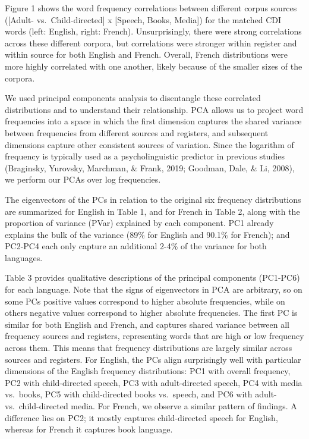 \documentclass[10pt, letterpaper]{article}
\begin{document}
Figure 1 shows the word frequency correlations between different corpus
sources ({[}Adult- vs.~Child-directed{]} x {[}Speech, Books, Media{]})
for the matched CDI words (left: English, right: French).
Unsurprisingly, there were strong correlations across these different
corpora, but correlations were stronger within register and within
source for both English and French. Overall, French distributions were
more highly correlated with one another, likely because of the smaller
sizes of the corpora.

We used principal components analysis to disentangle these correlated
distributions and to understand their relationship. PCA allows us to
project word frequencies into a space in which the first dimension
captures the shared variance between frequencies from different sources
and registers, and subsequent dimensions capture other consistent
sources of variation. Since the logarithm of frequency is typically used
as a psycholinguistic predictor in previous studies (Braginsky,
Yurovsky, Marchman, \& Frank, 2019; Goodman, Dale, \& Li, 2008), we
perform our PCAs over log frequencies.

The eigenvectors of the PCs in relation to the original six frequency
distributions are summarized for English in Table 1, and for French in
Table 2, along with the proportion of variance (PVar) explained by each
component. PC1 already explains the bulk of the variance (89\% for
English and 90.1\% for French); and PC2-PC4 each only capture an
additional 2-4\% of the variance for both languages.

Table 3 provides qualitative descriptions of the principal components
(PC1-PC6) for each language. Note that the signs of eigenvectors in PCA
are arbitrary, so on some PCs positive values correspond to higher
absolute frequencies, while on others negative values correspond to
higher absolute frequencies. The first PC is similar for both English
and French, and captures shared variance between all frequency sources
and registers, representing words that are high or low frequency across
them. This means that frequency distributions are largely similar across
sources and registers. For English, the PCs align surprisingly well with
particular dimensions of the English frequency distributions: PC1 with
overall frequency, PC2 with child-directed speech, PC3 with
adult-directed speech, PC4 with media vs.~books, PC5 with child-directed
books vs.~speech, and PC6 with adult- vs.~child-directed media. For
French, we observe a similar pattern of findings. A difference lies on
PC2; it mostly captures child-directed speech for English, whereas for
French it captures book language.
\end{document}

